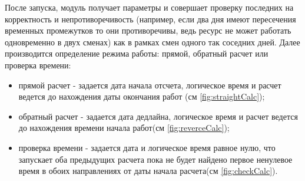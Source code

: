 \indent После запуска, модуль получает параметры и совершает проверку последних на корректность и непротиворечивость (например, если два дня имеют пересечения временных промежутков то они противоречивы, ведь ресурс не может работать одновременно в двух сменах) как в рамках смен одного так соседних дней.
Далее производится определение режима работы: прямой, обратный расчет или проверка времени:

\begin{itemize}
	\item прямой расчет - задается дата начала отсчета, логическое время и расчет ведется до нахождения даты окончания работ (см \ref{fig:straightCalc});
	\item обратный расчет - задается дата дедлайна, логическое время и расчет ведется до нахождения времени начала работ(см \ref{fig:reverceCalc});
	\item проверка времени - задается дата и логическое время равное нулю, что запускает оба предыдущих расчета пока не будет найдено первое ненулевое время в обоих направлениях от даты начала расчета(см \ref{fig:checkCalc}).
\end{itemize}

